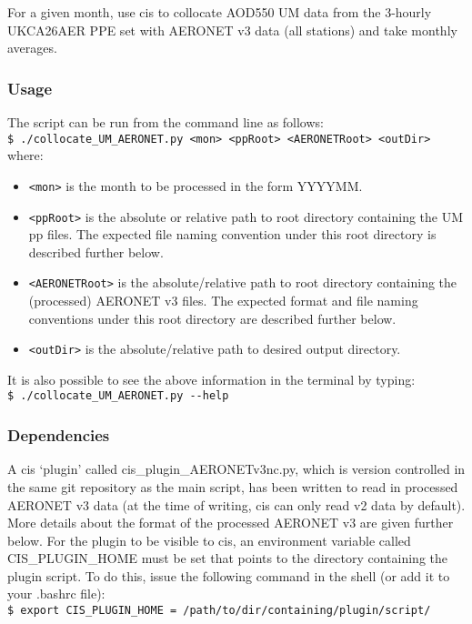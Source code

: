 \documentclass[10pt,a4paper]{article}
\newcommand\tab[1][0.5cm]{\hspace*{#1}}
\begin{document}
For a given month, use cis to collocate AOD550 UM data from the 3-hourly UKCA26AER PPE set with AERONET v3 data (all stations) and take monthly averages.

\subsubsection{Usage}
The script can be run from the command line as follows:\\
\tab \texttt{\$ ./collocate\_UM\_AERONET.py <mon> <ppRoot> <AERONETRoot> <outDir>}\\
where:
\begin{itemize}
\item \texttt{<mon>} is the month to be processed in the form YYYYMM.
\item \texttt{<ppRoot>} is the absolute or relative path to root directory containing the UM pp files. The expected file naming convention under this root directory is described further below.
\item \texttt{<AERONETRoot>} is the absolute/relative path to root directory containing the (processed) AERONET v3 files. The expected format and file naming conventions under this root directory are described further below.
\item \texttt{<outDir>} is the absolute/relative path to desired output directory.
\end{itemize}
It is also possible to see the above information in the terminal by typing:\\
\tab \texttt{\$ ./collocate\_UM\_AERONET.py -{}-help}

\subsubsection{Dependencies}
A cis `plugin' called cis\_plugin\_AERONETv3nc.py, which is version controlled in the same git repository as the main script, has been written to read in processed AERONET v3 data (at the time of writing, cis can only read v2 data by default). More details about the format of the processed AERONET v3 are given further below. For the plugin to be visible to cis, an environment variable called CIS\_PLUGIN\_HOME must be set that points to the directory containing the plugin script. To do this, issue the following command in the shell (or add it to your .bashrc file):\\
\tab \texttt{\$ export CIS\_PLUGIN\_HOME = /path/to/dir/containing/plugin/script/}\\
\end{document}
